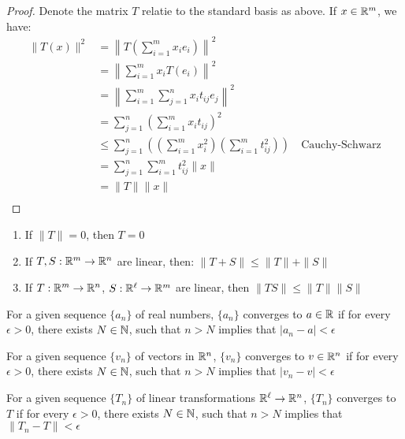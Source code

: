 \documentclass[../main/main.tex]{subfiles}
\begin{document}
\begin{proof}
    Denote the matrix $T$ relatie to the standard basis as above. If $x \in \mathbb{R}^{m}$, we have: 
\begin{align*} 
    \|T(x)\|^2 &= \left\|T\left( \sum_{i=1}^{m} x_ie_i \right)\right \|^2 \\ &= \left\|\sum_{i=1}^{m} x_iT(e_i)\right\|^2 \\
    &= \left\| \sum_{i=1}^{m} \sum_{j=1}^{n} x_i  t_{ij}e_j \right\|^2\\
    &= \sum_{j=1}^{n} \left( \sum_{i=1}^{m} x_it_{ij} \right)^2  \\
    &\le \sum_{j=1}^{n} \left( \left( \sum_{i=1}^{m} x_i^2 \right) \left( \sum_{i=1}^{m} t_{ij}^2 \right) \right) \quad \text{Cauchy-Schwarz} \\
    &=\sum_{j=1}^{n} \sum_{i=1}^{m} t_{ij}^2 \|x\|\\
    &= \|T\|\|x\| \\
\end{align*}
\end{proof}
\begin{lemma}
    \begin{enumerate}
        \item  If $\|T\|=0$, then $T=0$
        \item If $T,S: \mathbb{R}^{m}\to  \mathbb{R}^{n}$ are linear, then: $\|T+S\| \le  \|T\| + \|S\|$
        \item If $T: \mathbb{R}^{m} \to  \mathbb{R}^{n}$, $S: \mathbb{R}^{\ell} \to \mathbb{R}^{m} $ are linear, then $\|TS\| \le \|T\|\|S\|$
    \end{enumerate}
\end{lemma}
\begin{definition} 
    For a given sequence $ \{a_n\} $ of real numbers, $\{a_n\} $ converges to $a\in \mathbb{R}$ if for every $\epsilon > 0$, there exists $N \in  \mathbb{N} $, such that $n>N$ implies that $|a_n-a|<\epsilon$ 
\end{definition}
\begin{definition}
    For a given sequence $ \{v_n\} $ of vectors in $ \mathbb{R}^{n}$, $\{v_n\} $ converges to $v\in \mathbb{R}^{n}$ if for every $\epsilon > 0$, there exists $N \in  \mathbb{N} $, such that $n>N$ implies that $|v_n-v|<\epsilon$ 
\end{definition}
\begin{definition}
    For a given sequence $ \{T_n\} $ of linear transformations $ \mathbb{R}^{\ell} \to  \mathbb{R}^{n}$, $\{T_n\} $ converges to $T$ if for every $\epsilon > 0$, there exists $N \in  \mathbb{N} $, such that $n>N$ implies that $\|T_n-T\|<\epsilon$ 
\end{definition}
\end{document}
